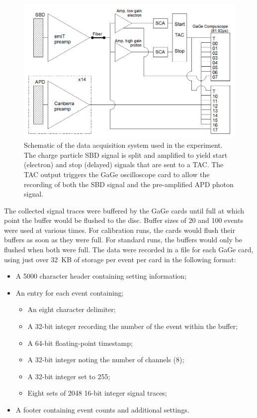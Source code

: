 \documentclass[oneside,12pt]{memoir}
\begin{document}
\begin{figure}[t]
	\includegraphics[width=\textwidth]{Electronics_schematic.png}
	\caption[Schematic of data acquisition system.]{Schematic of the data acquisition system used in the experiment. The charge particle SBD signal is split and amplified to yield start (electron) and stop (delayed) signals that are sent to a TAC. The TAC output triggers the GaGe oscilloscope card to allow the recording of both the SBD signal and the pre-amplified APD photon signal.}
	\label{fig:daq}
\end{figure}
The collected signal traces were buffered by the GaGe cards until full at which point the buffer would be flushed to the disc. Buffer sizes of 20 and 100 events were used at various times. For calibration runs, the cards would flush their buffers as soon as they were full. For standard runs, the buffers would only be flushed when both were full. The data were recorded in a file for each GaGe card, using just over 32~KB of storage per event per card in the following format:\par
\begin{itemize}
	\item A 5000 character header containing setting information;
	\item An entry for each event containing;
	\begin{itemize}
		\item An eight character delimiter;
		\item A 32-bit integer recording the number of the event within the buffer;
		\item A 64-bit floating-point timestamp;
		\item A 32-bit integer noting the number of channels (8);
		\item A 32-bit integer set to 255;
		\item Eight sets of 2048 16-bit integer signal traces;
	\end{itemize}
	\item A footer containing event counts and additional settings.
\end{itemize}\par
\end{document}
